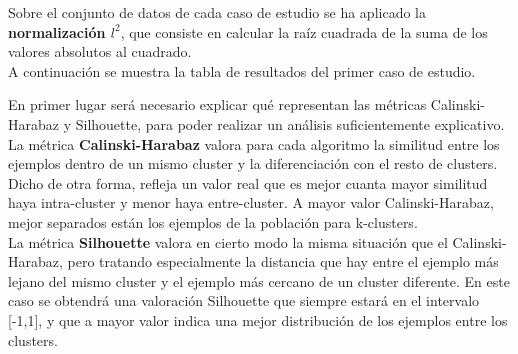 	Sobre el conjunto de datos de cada caso de estudio se ha aplicado la \textbf{normalización $l^2$}, que consiste en calcular la raíz cuadrada de la suma de los valores absolutos al cuadrado.\\

	A continuación se muestra la tabla de resultados del primer caso de estudio.
	
	\begin{table}[H]
		\centering
		\caption{Resultados de los algoritmos de clustering para el primer caso de estudio.}
		\label{tablaTodos1}
	\end{table}

	En primer lugar será necesario explicar qué representan las métricas Calinski-Harabaz y Silhouette, para poder realizar un análisis suficientemente explicativo.\\
	
	La métrica \textbf{Calinski-Harabaz} valora para cada algoritmo la similitud entre los ejemplos dentro de un mismo cluster y la diferenciación con el resto de clusters. Dicho de otra forma, refleja un valor real que es mejor cuanta mayor similitud haya intra-cluster y menor haya entre-cluster. A mayor valor Calinski-Harabaz, mejor separados están los ejemplos de la población para k-clusters.\\
	
	La métrica \textbf{Silhouette} valora en cierto modo la misma situación que el Calinski-Harabaz, pero tratando especialmente la distancia que hay entre el ejemplo más lejano del mismo cluster y el ejemplo más cercano de un cluster diferente. En este caso se obtendrá una valoración Silhouette que siempre estará en el intervalo [-1,1], y que a mayor valor indica una mejor distribución de los ejemplos entre los clusters.\\

